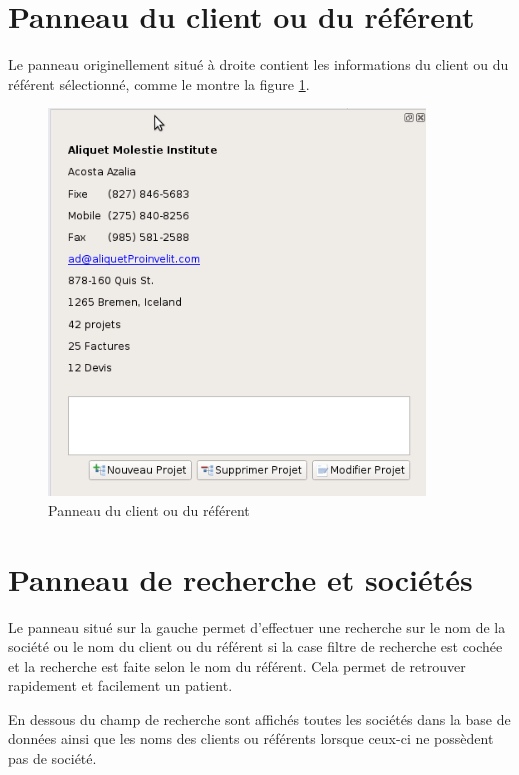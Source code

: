 \section{Panneau du client ou du référent}
Le panneau originellement situé à droite contient les informations du client ou du référent sélectionné, comme le montre la figure
\ref{fig:rightpanel}.

\begin{figure}[H]
	\centering
	\includegraphics[width=10cm]{screens/dockDroite.png}
	\caption{Panneau du client ou du référent}
	\label{fig:rightpanel}
\end{figure}

\section{Panneau de recherche et sociétés}
Le panneau situé sur la gauche permet d’effectuer une recherche sur le nom de la société ou le nom du client ou du référent si la case
filtre de recherche est cochée et la recherche est faite selon le nom du référent. Cela permet de retrouver rapidement et facilement un
patient.

En dessous du champ de recherche sont affichés toutes les sociétés dans la base de données ainsi que les noms des clients ou référents
lorsque ceux-ci ne possèdent pas de société.




